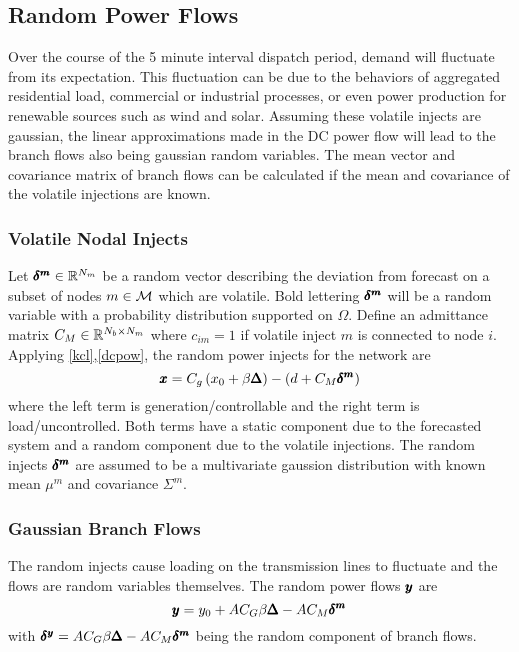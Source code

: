 \subsection{Random Power Flows}
Over the course of the 5 minute interval dispatch period, demand will fluctuate from its expectation.  This  fluctuation can be due to the behaviors of aggregated residential load, commercial or industrial processes, or even power production for renewable sources such as wind and solar.  Assuming these volatile injects are gaussian, the linear approximations made in the DC power flow will lead to the branch flows also being gaussian random variables.  The mean vector and covariance matrix of branch flows can be calculated if the mean and covariance of the volatile injections are known.
\subsubsection*{Volatile Nodal Injects}
Let $\pmb{\delta^m} \in \mathbb{R}^{N_m}$ be a random vector describing the deviation from forecast on a subset of nodes $m \in \mathcal{M}$ which are volatile.  Bold lettering $\pmb{\delta^m}$ will be a random variable with a probability distribution supported on $\Omega$.  Define an admittance matrix $C_M \in \mathbb{R}^{N_b \times N_m}$ where $c_{im}=1$ if volatile inject $m$ is connected to node $i$.  Applying \ref{kcl},\ref{dcpow}, the random power injects for the network are
\begin{equation}\label{rand_inj}
 \pmb{x} = C_g\left(x_0+\beta \pmb{\Delta}\right) - (d + C_M \pmb{\delta^m}) 
\end{equation}
 where the left term is generation/controllable and the right term is load/uncontrolled.  Both terms have a static component due to the forecasted system and a random component due to the volatile injections.  The random injects $\pmb{\delta^m}$ are assumed to be a multivariate gaussion distribution with known mean $\mu^m$ and covariance $\Sigma^m$.  

\subsubsection*{Gaussian Branch Flows}
The random injects cause loading on the transmission lines to fluctuate and the flows are random variables themselves.   The random power flows $\pmb{y}$ are
\begin{equation}\label{rand_flow}
 \pmb{y} = y_0+ A C_G \beta \pmb{\Delta}  - A C_M \pmb{\delta^m} 
\end{equation}
with $\pmb{\delta^y} = A C_G \beta \pmb{\Delta} - AC_M \pmb{\delta^m}$ being the random component of branch flows.

